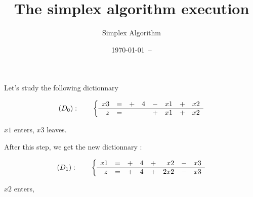 \documentclass{article}
\title{The simplex algorithm execution}
\author{Simplex Algorithm}
\date{\today ~-- \currenttime}
\begin{document}
 
 
\maketitle 
 
Let's study the following dictionnary 
 
\[ 
(D_0):\qquad \left \{ 
\begin{array}{rc*3{cr}} 
x3 & =& + &4& - &x1 & + &x2 \\ 
\hline 
z & =& && + &x1 & + &x2 \end{array} \right. 
\] 
 
$x1$ enters, $x3$ leaves. 
 
After this step, we get the new dictionnary : 
 
\[ 
(D_1):\qquad \left \{ 
\begin{array}{rc*3{cr}} 
x1 & =& + &4& + &x2 & - &x3 \\ 
\hline 
z & =& + &4& + &2x2 & - &x3 \end{array} \right. 
\] 
 
$x2$ enters, 
\end{document}
